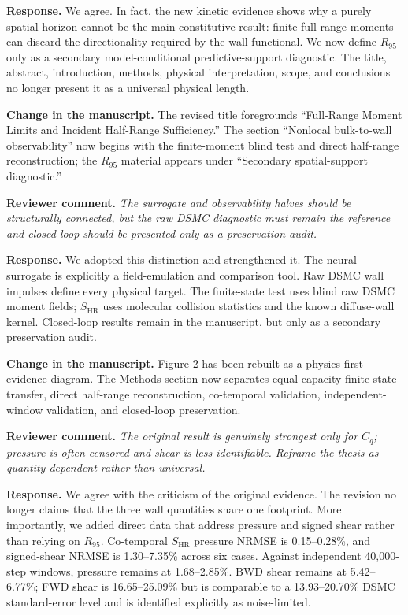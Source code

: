\documentclass[11pt]{article}
\newcommand{\reviewer}[1]{\vspace{0.4em}\noindent\textbf{Reviewer comment.} \emph{#1}}
\newcommand{\response}{\noindent\textbf{Response.} }
\newcommand{\change}{\noindent\textbf{Change in the manuscript.} }
\begin{document}
\response We agree. In fact, the new kinetic evidence shows why a purely spatial horizon cannot be the main constitutive result: finite full-range moments can discard the directionality required by the wall functional. We now define $R_{95}$ only as a secondary model-conditional predictive-support diagnostic. The title, abstract, introduction, methods, physical interpretation, scope, and conclusions no longer present it as a universal physical length.

\change The revised title foregrounds ``Full-Range Moment Limits and Incident Half-Range Sufficiency.'' The section ``Nonlocal bulk-to-wall observability'' now begins with the finite-moment blind test and direct half-range reconstruction; the $R_{95}$ material appears under ``Secondary spatial-support diagnostic.''

\reviewer{The surrogate and observability halves should be structurally connected, but the raw DSMC diagnostic must remain the reference and closed loop should be presented only as a preservation audit.}

\response We adopted this distinction and strengthened it. The neural surrogate is explicitly a field-emulation and comparison tool. Raw DSMC wall impulses define every physical target. The finite-state test uses blind raw DSMC moment fields; $S_{\mathrm{HR}}$ uses molecular collision statistics and the known diffuse-wall kernel. Closed-loop results remain in the manuscript, but only as a secondary preservation audit.

\change Figure 2 has been rebuilt as a physics-first evidence diagram. The Methods section now separates equal-capacity finite-state transfer, direct half-range reconstruction, co-temporal validation, independent-window validation, and closed-loop preservation.

\reviewer{The original result is genuinely strongest only for $C_q$; pressure is often censored and shear is less identifiable. Reframe the thesis as quantity dependent rather than universal.}

\response We agree with the criticism of the original evidence. The revision no longer claims that the three wall quantities share one footprint. More importantly, we added direct data that address pressure and signed shear rather than relying on $R_{95}$. Co-temporal $S_{\mathrm{HR}}$ pressure NRMSE is 0.15--0.28\%, and signed-shear NRMSE is 1.30--7.35\% across six cases. Against independent 40,000-step windows, pressure remains at 1.68--2.85\%. BWD shear remains at 5.42--6.77\%; FWD shear is 16.65--25.09\% but is comparable to a 13.93--20.70\% DSMC standard-error level and is identified explicitly as noise-limited.
\end{document}
